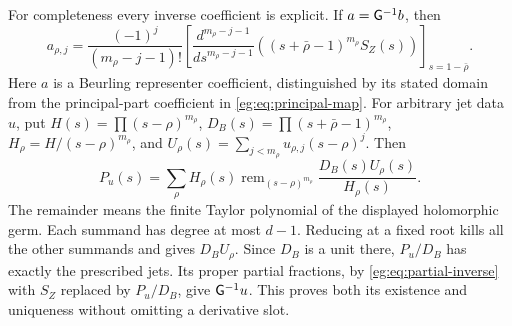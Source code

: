 \documentclass[11pt]{article}
\begin{document}
For completeness every inverse coefficient is explicit. If $a=\mathsf G^{-1}b$,
then
\[
 a_{\rho,j}=\frac{(-1)^j}{(m_\rho-j-1)!}
 \left[\frac{d^{m_\rho-j-1}}{ds^{m_\rho-j-1}}
       ((s+\bar\rho-1)^{m_\rho}S_Z(s))\right]_{s=1-\bar\rho}.
 \tag{EG14}\label{eg:eq:partial-inverse}
\]
Here $a$ is a Beurling representer coefficient, distinguished by its
stated domain from the principal-part coefficient in \eqref{eg:eq:principal-map}.
For arbitrary jet data $u$, put
$H(s)=\prod(s-\rho)^{m_\rho}$,
$D_B(s)=\prod(s+\bar\rho-1)^{m_\rho}$,
$H_\rho=H/(s-\rho)^{m_\rho}$, and
$U_\rho(s)=\sum_{j<m_\rho}u_{\rho,j}(s-\rho)^j$. Then
\[
 P_u(s)=\sum_\rho H_\rho(s)
 \operatorname{rem}_{(s-\rho)^{m_\rho}}
                    \frac{D_B(s)U_\rho(s)}{H_\rho(s)}.
 \tag{EG15}\label{eg:eq:Hermite-inverse}
\]
The remainder means the finite Taylor polynomial of the displayed
holomorphic germ. Each summand has degree at most $d-1$. Reducing
at a fixed root kills all the other summands and gives $D_BU_\rho$.
Since $D_B$ is a unit there, $P_u/D_B$ has exactly the prescribed
jets. Its proper partial fractions, by \eqref{eg:eq:partial-inverse}
with $S_Z$ replaced by $P_u/D_B$, give $\mathsf G^{-1}u$. This proves
both its existence and uniqueness without omitting a derivative slot.
\end{document}
